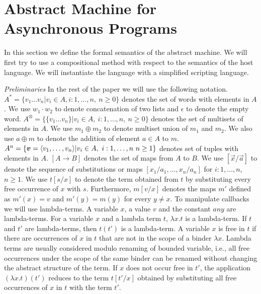 \section{Abstract Machine for Asynchronous Programs}
\label{sec:am}
%
In this section we define the formal semantics of the abstract machine.
We will first try to use a compositional method with respect to the semantics of the host language.
We will instantiate the language with a simplified scripting language.

{\it Preliminaries}
In the rest of the paper we will use the following notation.
$A^*=\{ v_1\ldots v_n| v_i\in A,i:1,\ldots,n,\ n\geq 0\}$  denotes the set of words with elements 
in $A$.  
We use $w_1\cdot w_2$ to denote concatenation of two lists and $\epsilon$ to denote the empty word.   
 $A^\otimes=\{ \{v_1\ldots v_n\}| v_i\in A,\ i:1,\ldots,n,\ n\geq 0\}$ denotes the set of multisets of elements  in $A$. 
We use $m_1\oplus m_2$ to denote multiset union of $m_1$ and $m_2$. 
We also use $a\oplus m$ to denote the addition of  element $a\in A$ to $m$.  
$A^n=\{  \vec{v}=\tuple{v_1,\ldots,v_n} | v_i\in A,\ i:1,\ldots,n\ n\geq 1\}$ denotes set of tuples with elements in $A$.
$[A\rightarrow B]$ denotes the set of maps from $A$ to $B$. 
We use $[\vec{x}/\vec{a}]$ to denote the sequence of substitutions or maps $[x_1/a_1,\ldots,x_n/a_n]$  for $i:1,\ldots,n$, $n\geq 1$. 
We use $t[s/x]$ to denote the term obtained from $t$ by substituting every free occurrence of $x$ with $s$.
Furthermore, $m[v/x]$ denotes the maps $m'$ defined as $m'(x)=v$ and $m'(y)=m(y)$ for every $y\neq x$.
%
To manipulate callbacks we will use lambda-terms.
A variable $x$, a value $v$ and the constant $any$ are lambda-terms.  
For a variable $x$ and a lambda term $t$, $\lambda x.t$ is a lambda-term. If $t$ and $t'$ are lambda-terms, 
then $t(t')$  is a lambda-term. A variable $x$ is free in $t$ if there are occurrences of $x$ in $t$ that are not in the scope of a 
binder $\lambda x$. Lambda terms are usually considered modulo renaming of bounded variable, i.e., 
all free occurrences under the scope of the same binder can be renamed without changing the abstract structure of the term.
If $x$ does not occur free in $t'$, the application $(\lambda x.t)(t')$ reduces to the term $t[t'/x]$ obtained by substituting all free occurrences of $x$ in $t$ with the term $t'$.

